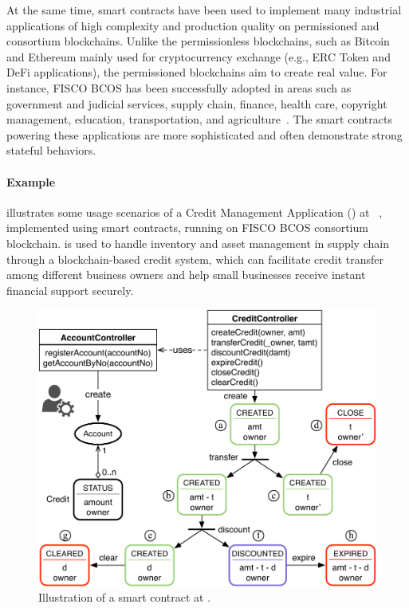 At the same time, smart contracts have been used to implement many industrial applications of high
complexity and production quality on permissioned and consortium blockchains.
Unlike the permissionless blockchains, such as Bitcoin and Ethereum mainly used for cryptocurrency
exchange (e.g., ERC Token and DeFi applications), the permissioned blockchains aim to create real
value.
For instance, FISCO BCOS has been successfully adopted in areas such as government and judicial services, supply chain, finance, health care, copyright management, education, transportation, and
agriculture~\cite{fisco}.
The smart contracts powering these applications are more sophisticated and often demonstrate strong
stateful behaviors.

\paragraph{Example}
 illustrates some usage scenarios of a Credit Management Application (\wecredit)
at \company~\cite{webank}, implemented using smart contracts, running on FISCO BCOS consortium
blockchain.
\wecredit is used to handle inventory and asset management in supply chain through a blockchain-based credit system,
which can facilitate credit transfer among different business owners and help small
businesses receive instant financial support securely.

\begin{figure}[t]
	\centering
	\includegraphics[width=.80\columnwidth]{Figures/Chapter3/modcon.pdf}
	\caption{Illustration of a \wecredit smart contract at \company.}
	\label{fig:scenario}
\end{figure}

